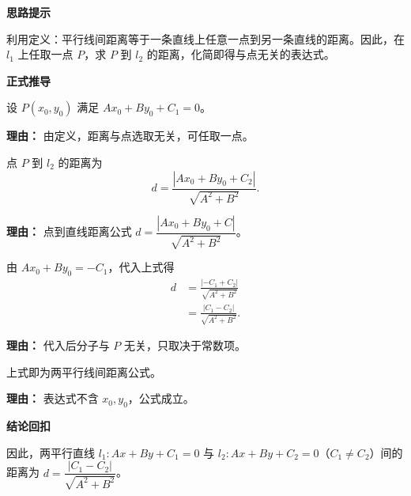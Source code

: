 \begin{proofbox}
	\textbf{\textcolor{CProof}{思路提示}}

	利用定义：平行线间距离等于一条直线上任意一点到另一条直线的距离。因此，在 $l_1$ 上任取一点 $P$，求 $P$ 到 $l_2$ 的距离，化简即得与点无关的表达式。

	\medskip
	\textbf{\textcolor{CProof}{正式推导}}
	\begin{description}[style=nextline, leftmargin=2.8em, labelsep=0.5em, itemsep=0.55em]
		\item[\textbf{步骤一（取点代入）：}] 设 $P(x_0,y_0)$ 满足 $Ax_0+By_0+C_1=0$。
			\par\textbf{理由：} 由定义，距离与点选取无关，可任取一点。

		\item[\textbf{步骤二（距离公式）：}] 点 $P$ 到 $l_2$ 的距离为
			\[
				d = \frac{|Ax_0+By_0+C_2|}{\sqrt{A^{2}+B^{2}}}.
			\]
			\par\textbf{理由：} 点到直线距离公式 $d = \dfrac{|Ax_0+By_0+C|}{\sqrt{A^{2}+B^{2}}}$。

		\item[\textbf{步骤三（代入化简）：}] 由 $Ax_0+By_0 = -C_1$，代入上式得
			\[
				\begin{aligned}
					d &= \frac{| -C_1 + C_2 |}{\sqrt{A^{2}+B^{2}}} \\
					&= \frac{|C_1-C_2|}{\sqrt{A^{2}+B^{2}}}.
			\end{aligned}
			\]
			\par\textbf{理由：} 代入后分子与 $P$ 无关，只取决于常数项。

		\item[\textbf{步骤四（得出公式）：}] 上式即为两平行线间距离公式。
			\par\textbf{理由：} 表达式不含 $x_0,y_0$，公式成立。
	\end{description}

	\medskip
	\textbf{\textcolor{CProof}{结论回扣}}

	因此，两平行直线 $l_1:Ax+By+C_1=0$ 与 $l_2:Ax+By+C_2=0$（$C_1\neq C_2$）间的距离为 $d = \dfrac{|C_1-C_2|}{\sqrt{A^{2}+B^{2}}}$。
\end{proofbox}
